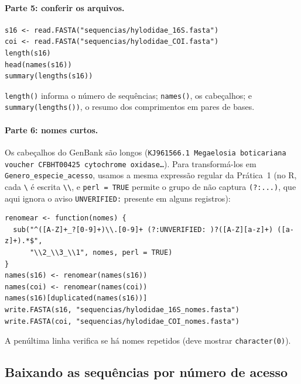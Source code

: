 \documentclass[11pt,a4paper]{article}
\begin{document}
\paragraph{Parte 5: conferir os arquivos.}
\begin{Verbatim}
s16 <- read.FASTA("sequencias/hylodidae_16S.fasta")
coi <- read.FASTA("sequencias/hylodidae_COI.fasta")
length(s16)
head(names(s16))
summary(lengths(s16))
\end{Verbatim}
\verb|length()| informa o número de sequências; \verb|names()|, os cabeçalhos; e
\verb|summary(lengths())|, o resumo dos comprimentos em pares de bases.

\paragraph{Parte 6: nomes curtos.} Os cabeçalhos do GenBank são longos
(\texttt{KJ961566.1 Megaelosia boticariana voucher CFBHT00425 cytochrome oxidase\ldots}).
Para transformá-los em \verb|Genero_especie_acesso|, usamos a mesma expressão regular da
Prática~1 (no R, cada \verb|\| é escrita \verb|\\|, e \verb|perl = TRUE| permite o grupo de não
captura \verb|(?:...)|, que aqui ignora o aviso \texttt{UNVERIFIED:} presente em alguns
registros):
\begin{Verbatim}[fontsize=\footnotesize]
renomear <- function(nomes) {
  sub("^([A-Z]+_?[0-9]+)\\.[0-9]+ (?:UNVERIFIED: )?([A-Z][a-z]+) ([a-z]+).*$",
      "\\2_\\3_\\1", nomes, perl = TRUE)
}
names(s16) <- renomear(names(s16))
names(coi) <- renomear(names(coi))
names(s16)[duplicated(names(s16))]
write.FASTA(s16, "sequencias/hylodidae_16S_nomes.fasta")
write.FASTA(coi, "sequencias/hylodidae_COI_nomes.fasta")
\end{Verbatim}
A penúltima linha verifica se há nomes repetidos (deve mostrar \verb|character(0)|).

\subsection{Baixando as sequências por número de acesso}\label{sec:acesso}
\end{document}
